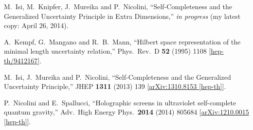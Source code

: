 \documentclass[10pt,a4paper]{article}
\begin{document}
\begin{thebibliography}{}
  M.~Isi, M.~Knipfer, J.~Mureika and P.~Nicolini,
  ``Self-Completeness and the Generalized Uncertainty Principle in Extra Dimensions,'' \textit{in progress} (my latest copy: April 26, 2014).
  
  A.~Kempf, G.~Mangano and R.~B.~Mann,
  ``Hilbert space representation of the minimal length uncertainty relation,''
  Phys.\ Rev.\ D {\bf 52} (1995) 1108
  [\href{http://arxiv.org/abs/hep-th/9412167}{hep-th/9412167}].

  M.~Isi, J.~Mureika and P.~Nicolini,
  ``Self-Completeness and the Generalized Uncertainty Principle,''
  JHEP {\bf 1311} (2013) 139
  [\href{http://arxiv.org/abs/arXiv:1310.8153}{arXiv:1310.8153 [hep-th]}].
  
  
  P.~Nicolini and E.~Spallucci,
  ``Holographic screens in ultraviolet self-complete quantum gravity,''
  Adv.\ High Energy Phys.\  {\bf 2014} (2014) 805684
  [\href{http://arxiv.org/abs/arXiv:1210.0015}{arXiv:1210.0015 [hep-th]}].


\end{thebibliography}
\end{document}
